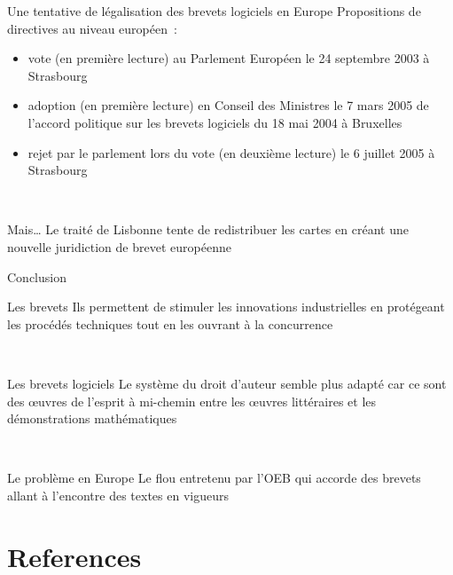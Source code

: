 \documentclass{beamer}
\begin{document}
\begin{frame}{Une tentative de légalisation des brevets logiciels en Europe}
    Propositions de directives au niveau européen~:
    \begin{itemize}
        \item vote (en première lecture) au Parlement Européen le 24 septembre
              2003 à Strasbourg
        \item adoption (en première lecture) en Conseil des Ministres le
              7 mars 2005 de l'accord politique sur les brevets logiciels
              du 18 mai 2004 à Bruxelles
        \item rejet par le parlement lors du vote (en deuxième lecture)
              le 6 juillet 2005 à Strasbourg
    \end{itemize}
    ~\\
    \begin{block}{Mais\dots}
        Le traité de Lisbonne tente de redistribuer les cartes en créant
        une nouvelle juridiction de brevet européenne
    \end{block}
\end{frame}

\begin{frame}{Conclusion}
    \begin{block}{Les brevets}
        Ils permettent de stimuler les innovations industrielles
        en protégeant les procédés techniques tout en les ouvrant à la
        concurrence
    \end{block}
    ~\\
    \begin{block}{Les brevets logiciels}
        Le système du droit d'auteur semble plus adapté car ce sont des
        œuvres de l'esprit à mi-chemin entre les œuvres littéraires et
        les démonstrations mathématiques
    \end{block}
    ~\\
    \begin{block}{Le problème en Europe}
        Le flou entretenu par l'OEB qui accorde des brevets allant à
        l'encontre des textes en vigueurs
    \end{block}
\end{frame}


\appendix

\section*{References}
\end{document}

